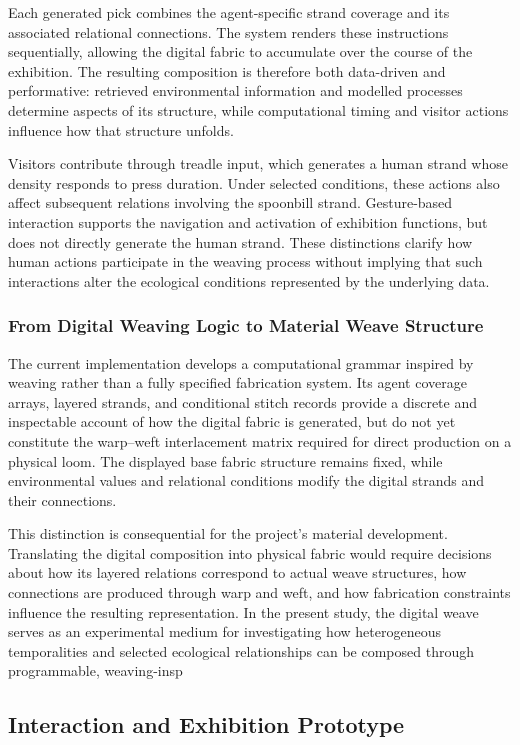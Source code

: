 \documentclass[manuscript,review,anonymous]{acmart}
\begin{document}
Each generated pick combines the agent-specific strand coverage and its associated relational connections. The system renders these instructions sequentially, allowing the digital fabric to accumulate over the course of the exhibition. The resulting composition is therefore both data-driven and performative: retrieved environmental information and modelled processes determine aspects of its structure, while computational timing and visitor actions influence how that structure unfolds.

Visitors contribute through treadle input, which generates a human strand whose density responds to press duration. Under selected conditions, these actions also affect subsequent relations involving the spoonbill strand. Gesture-based interaction supports the navigation and activation of exhibition functions, but does not directly generate the human strand. These distinctions clarify how human actions participate in the weaving process without implying that such interactions alter the ecological conditions represented by the underlying data.

\subsubsection{From Digital Weaving Logic to Material Weave Structure}

The current implementation develops a computational grammar inspired by weaving rather than a fully specified fabrication system. Its agent coverage arrays, layered strands, and conditional stitch records provide a discrete and inspectable account of how the digital fabric is generated, but do not yet constitute the warp–weft interlacement matrix required for direct production on a physical loom. The displayed base fabric structure remains fixed, while environmental values and relational conditions modify the digital strands and their connections.

This distinction is consequential for the project's material development. Translating the digital composition into physical fabric would require decisions about how its layered relations correspond to actual weave structures, how connections are produced through warp and weft, and how fabrication constraints influence the resulting representation. In the present study, the digital weave serves as an experimental medium for investigating how heterogeneous temporalities and selected ecological relationships can be composed through programmable, weaving-insp

\subsection{Interaction and Exhibition Prototype}
\end{document}
